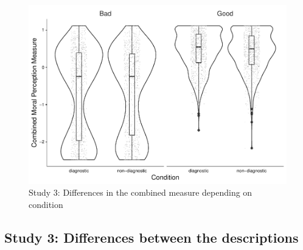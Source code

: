 \documentclass[
  american,
  man,floatsintext]{apa7}
\begin{document}
\begin{figure}[!h]
\includegraphics[width=\textwidth,]{Supplementary_files/figure-latex/S3combinedplot-1} \caption{Study 3: Differences in the combined measure depending on condition}\label{fig:S3combinedplot}
\end{figure}

\newpage

\hypertarget{study-3-differences-between-the-descriptions}{%
\subsection{Study 3: Differences between the descriptions}\label{study-3-differences-between-the-descriptions}}

\newpage
\end{document}
